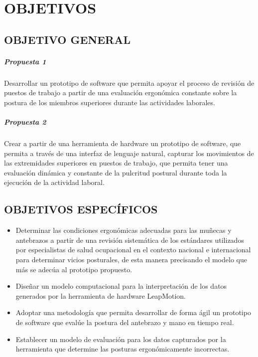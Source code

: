 \chapter{OBJETIVOS}
\section{OBJETIVO GENERAL}
\paragraph{Propuesta 1}
Desarrollar un prototipo de software que permita apoyar el proceso de revisión de puestos de trabajo a partir de una evaluación ergonómica constante sobre la postura de los miembros superiores durante las actividades laborales.
\paragraph{Propuesta 2}
Crear a partir de una herramienta de hardware un prototipo de software, que permita a través de una interfaz de lenguaje natural, capturar los movimientos de las extremidades superiores en puestos de trabajo, que permita tener una evaluación dinámica y  constante de la pulcritud postural durante toda la ejecución de la actividad laboral. 
\section{OBJETIVOS ESPECÍFICOS}
\begin{itemize}
    \item Determinar las condiciones ergonómicas adecuadas para las muñecas y antebrazos a partir de una revisión sistemática de los estándares utilizados por especialistas de salud ocupacional en el contexto nacional e internacional para determinar vicios posturales,  de esta manera precisando el modelo que más se adecúa al prototipo propuesto.
    \item Diseñar un modelo computacional para la interpretación de los datos generados por la herramienta de hardware LeapMotion.
    \item Adoptar una metodología que permita desarrollar de forma ágil un prototipo de software que evalúe la postura del antebrazo y mano en tiempo real. 
    \item Establecer un modelo de evaluación para los datos capturados por la herramienta que determine las posturas ergonómicamente incorrectas. 
\end{itemize}